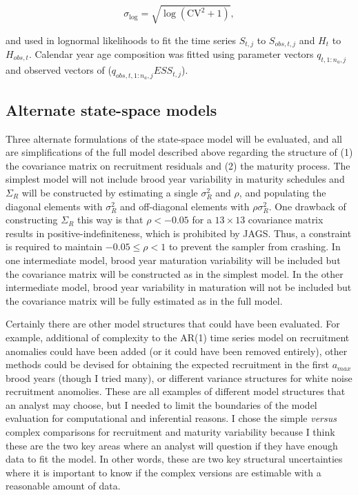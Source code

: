 \documentclass[12pt,]{book}
\theoremstyle{definition}
\theoremstyle{definition}
\theoremstyle{definition}
\theoremstyle{remark}
\begin{document}
\begin{equation}
  \sigma_{\text{log}}=\sqrt{\log(\text{CV}^2+1)},
  \label{eq:cv2sig}
\end{equation}

\noindent
and used in lognormal likelihoods to fit the time series \(S_{t,j}\) to
\(S_{obs,t,j}\) and \(H_t\) to \(H_{obs,t}\). Calendar year age
composition was fitted using parameter vectors \(q_{t,1:n_a,j}\) and
observed vectors of (\(q_{obs,t,1:n_a,j} ESS_{t,j}\)).

\subsection{Alternate state-space
models}\label{alternate-state-space-models}

\noindent
Three alternate formulations of the state-space model will be evaluated,
and all are simplifications of the full model described above regarding
the structure of (1) the covariance matrix on recruitment residuals and
(2) the maturity process. The simplest model will not include brood year
variability in maturity schedules and \(\Sigma_R\) will be constructed
by estimating a single \(\sigma_R^2\) and \(\rho\), and populating the
diagonal elements with \(\sigma_R^2\) and off-diagonal elements with
\(\rho \sigma_R^2\). One drawback of constructing \(\Sigma_R\) this way
is that \(\rho < -0.05\) for a \(13 \times 13\) covariance matrix
results in positive-indefiniteness, which is prohibited by JAGS. Thus, a
constraint is required to maintain \(-0.05 \le \rho < 1\) to prevent the
sampler from crashing. In one intermediate model, brood year maturation
variability will be included but the covariance matrix will be
constructed as in the simplest model. In the other intermediate model,
brood year variability in maturation will not be included but the
covariance matrix will be fully estimated as in the full model.

Certainly there are other model structures that could have been
evaluated. For example, additional of complexity to the AR(1) time
series model on recruitment anomalies could have been added (or it could
have been removed entirely), other methods could be devised for
obtaining the expected recruitment in the first \(a_{max}\) brood years
(though I tried many), or different variance structures for white noise
recruitment anomolies. These are all examples of different model
structures that an analyst may choose, but I needed to limit the
boundaries of the model evaluation for computational and inferential
reasons. I chose the simple \emph{versus} complex comparisons for
recruitment and maturity variability because I think these are the two
key areas where an analyst will question if they have enough data to fit
the model. In other words, these are two key structural uncertainties
where it is important to know if the complex versions are estimable with
a reasonable amount of data.
\end{document}
